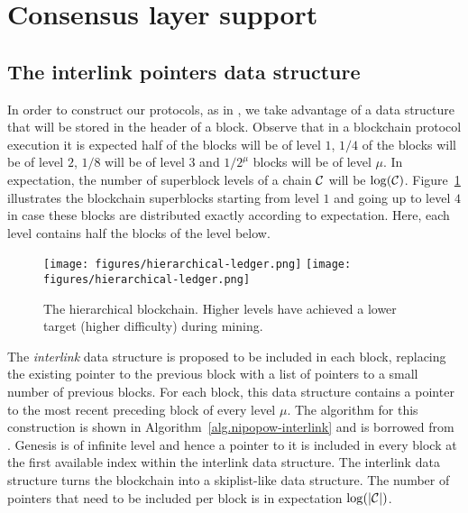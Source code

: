 \section{Consensus layer support} \label{sec.consensus}

\label{sec.interlink}

\subsection{The interlink pointers data structure}
In order to construct our protocols, as in \cite{KLS}, we take advantage
of a data structure that will be stored in the header of a block.
Observe that in a blockchain protocol execution
it is expected half of the blocks will be of level $1$, $1/4$
of the blocks will be of level $2$, $1/8$ will be of level $3$ and $1/2^\mu$
blocks will be of level $\mu$. In expectation, the number of superblock levels
of a chain $\mathcal{C}$ will be $\log(\mathcal{C})$. Figure~\ref{fig.hierarchy}
illustrates the blockchain superblocks starting from level $1$ and going up to
level $4$ in case these blocks are distributed exactly according to expectation.
Here, each level contains half the blocks of the level below.

\begin{figure}
    \caption{The hierarchical blockchain.
    Higher levels have achieved a lower target (higher difficulty) during mining.}
    \centering
    \iftwocolumn
        \texttt{[image: figures/hierarchical-ledger.png]}
    \else
        \texttt{[image: figures/hierarchical-ledger.png]}
    \fi
    \label{fig.hierarchy}
\end{figure}

The \textit{interlink} data structure is proposed to be included in each block,
replacing the existing pointer to the previous block with a list of pointers to
a small number of previous blocks. For each block, this data structure contains
a pointer to the most recent preceding block of every level $\mu$. The algorithm
for this construction is shown in Algorithm~\ref{alg.nipopow-interlink} and is
borrowed from \cite{KLS}. Genesis is of infinite level and hence a pointer to it
is included in every block at the first available index within the interlink
data structure. The interlink data structure turns the blockchain into a
skiplist-like data structure.  The number of pointers that need to be included
per block is in expectation $\log(|\mathcal{C}|)$.

